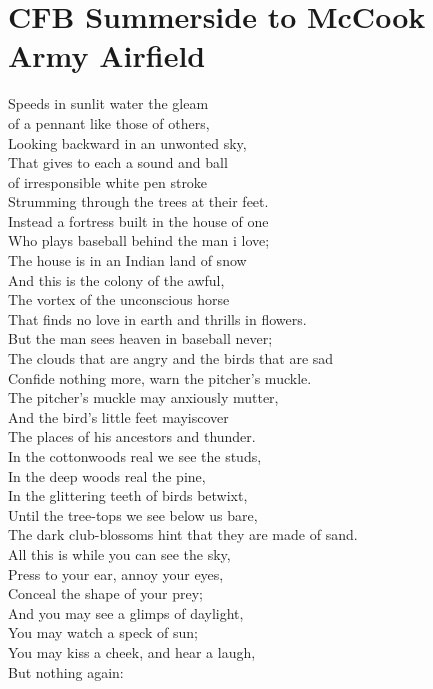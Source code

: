 \documentclass[smalldemyvopaper,11pt,twoside,onecolumn,openright,extrafontsizes]{memoir}
\begin{document}
\chapter{CFB Summerside to McCook Army Airfield}
Speeds in sunlit water the gleam
\\of a pennant like those of others,
\\Looking backward in an unwonted sky,
\\That gives to each a sound and ball
\\of irresponsible white pen stroke
\\Strumming through the trees at their feet.
\\Instead a fortress built in the house of one
\\Who plays baseball behind the man i love;
\\The house is in an Indian land of snow
\\And this is the colony of the awful,
\\The vortex of the unconscious horse
\\That finds no love in earth and thrills in flowers.
\\But the man sees heaven in baseball never;
\\The clouds that are angry and the birds that are sad
\\Confide nothing more, warn the pitcher's muckle.
\\The pitcher's muckle may anxiously mutter,
\\And the bird's little feet mayiscover
\\The places of his ancestors and thunder.
\\In the cottonwoods real we see the studs,
\\In the deep woods real the pine,
\\In the glittering teeth of birds betwixt,
\\Until the tree-tops we see below us bare,
\\The dark club-blossoms hint that they are made of sand.
\\All this is while you can see the sky,
\\Press to your ear, annoy your eyes,
\\Conceal the shape of your prey;
\\And you may see a glimps of daylight,
\\You may watch a speck of sun;
\\You may kiss a cheek, and hear a laugh,
\\But nothing again:
\end{document}
